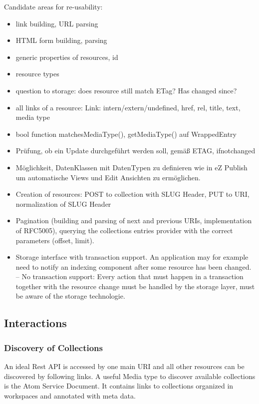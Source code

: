\documentclass[12pt,a4paper]{scrartcl}		%
\begin{document}
Candidate areas for re-usability:
\begin{itemize}
\item link building, URL parsing
\item HTML form building, parsing
\item generic properties of resources, id
\item resource types
\item question to storage: does resource still match ETag? Has changed since?
\item all links of a resource: Link: intern/extern/undefined, href, rel, title, text, media type
\item bool function matchesMediaType(), getMediaType() auf WrappedEntry
\item Prüfung, ob ein Update durchgeführt werden soll, gemäß ETAG, ifnotchanged
\item Möglichkeit, DatenKlassen mit DatenTypen zu definieren wie in eZ Publish um automatische Views und Edit Ansichten zu ermöglichen.
\item Creation of resources: POST to collection with SLUG Header, PUT to URI, normalization of SLUG Header
\item Pagination (building and parsing of next and previous URIs, implementation of RFC5005), querying the collections entries provider with the correct parameters (offset, limit).
\item Storage interface with transaction support. An application may for example need to notify an indexing component after some resource has been changed. -- No transaction support: Every action that must happen in a transaction together with the resource change must be handled by the storage layer, must be aware of the storage technologie.
\end{itemize}


\subsection{Interactions}
\label{sec:interactions}
\subsubsection{Discovery of Collections}
\label{sec:disc-coll}

An ideal Rest API is accessed by one main URI and all other resources can be
discovered by following links. A useful Media type to discover available
collections is the Atom Service Document.\cite[sec. 8]{RFC5023} It contains
links to collections organized in workspaces and annotated with meta data.
\end{document}
